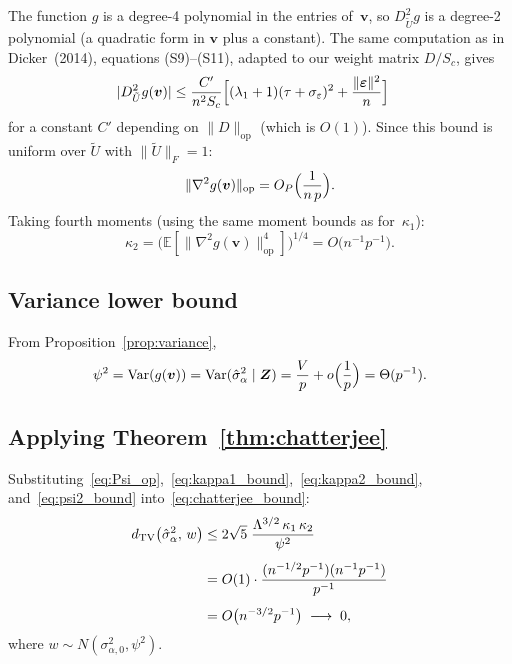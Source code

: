 \documentclass[11pt]{article}
\newcommand{\E}{\mathbb{E}}
\newcommand{\Var}{\operatorname{Var}}
\newcommand{\dTV}{d_{\mathrm{TV}}}
\newcommand{\op}{\mathrm{op}}
\newcommand{\Z}{\bm{Z}}
\newcommand{\beps}{\bm{\varepsilon}}
\newcommand{\bv}{\bm{v}}
\newcommand{\normsq}[1]{\|#1\|^{2}}
\begin{document}
The function $g$ is a degree-4 polynomial in the entries of~$\bv$, so
$D_{\tilde U}^{2}g$ is a degree-2 polynomial (a quadratic form in $\bv$
plus a constant).  The same computation as in Dicker~(2014), equations
(S9)--(S11), adapted to our weight matrix $D/S_c$, gives
\begin{align}
  |D_{\tilde U}^{2}g(\bv)|
  &\le \frac{C'}{n^{2}S_c}
    \Bigl[(\lambda_1+1)(\tau+\sigma_\varepsilon)^{2}
    + \frac{\normsq{\beps}}{n}\Bigr]
  \label{eq:DU2g_bound}
\end{align}
for a constant $C'$ depending on $\|D\|_{\op}$ (which is $O(1)$).  Since this
bound is uniform over $\tilde U$ with $\|\tilde U\|_F=1$:
\begin{equation}\label{eq:Hessian_norm_bound}
  \|\nabla^{2}g(\bv)\|_{\op}
  = O_P\Bigl(\frac{1}{n\,p}\Bigr).
\end{equation}
Taking fourth moments (using the same moment bounds as for~$\kappa_1$):
\begin{equation}\label{eq:kappa2_bound}
  \boxed{\;\kappa_2
  = \bigl(\E[\|\nabla^{2}g(\bv)\|_{\op}^{4}]\bigr)^{1/4}
  = O\bigl(n^{-1}p^{-1}\bigr).\;}
\end{equation}

\subsection{Variance lower bound}\label{ssec:psi}

From Proposition~\ref{prop:variance},
\begin{equation}\label{eq:psi2_bound}
  \psi^{2}
  = \Var(g(\bv))
  = \Var(\hat\sigma_\alpha^{2}\mid\Z)
  = \frac{V}{p}+o\Bigl(\frac{1}{p}\Bigr)
  = \Theta(p^{-1}).
\end{equation}

\subsection{Applying Theorem~\ref{thm:chatterjee}}

Substituting~\eqref{eq:Psi_op},~\eqref{eq:kappa1_bound},~\eqref{eq:kappa2_bound},
and~\eqref{eq:psi2_bound} into~\eqref{eq:chatterjee_bound}:
\begin{align}
  \dTV\bigl(\hat\sigma_\alpha^{2},\,w\bigr)
  &\le 2\sqrt{5}\;\frac{\Lambda^{3/2}\,\kappa_1\,\kappa_2}{\psi^{2}}
  \notag\\[4pt]
  &= O(1)\cdot\frac{(n^{-1/2}p^{-1})(n^{-1}p^{-1})}{p^{-1}}
  \notag\\[4pt]
  &= O\bigl(n^{-3/2}p^{-1}\bigr)
  \;\longrightarrow\; 0,
  \label{eq:dTV_rate}
\end{align}
where $w\sim N(\sigma_{\alpha,0}^{2},\psi^{2})$.
\end{document}
